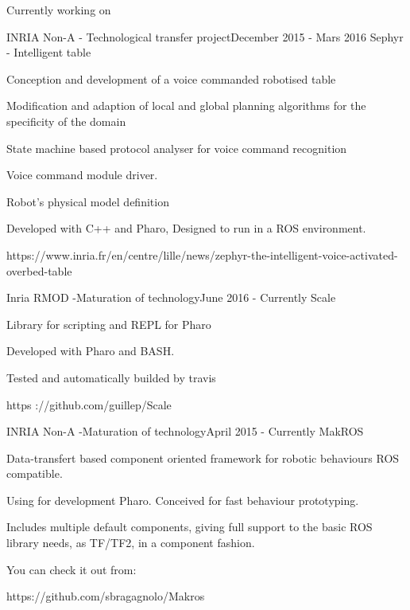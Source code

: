 \documentclass{resume} %
\begin{document}
\begin{rSection}{Currently working on}
	\begin{rSubsection}{INRIA Non-A - Technological transfer project}{December 2015 - Mars 2016 }{Sephyr - Intelligent table }
		\item 
		\item Conception and development of a voice commanded robotised table
		\item Modification and adaption of local and global planning algorithms for the specificity of the domain 
		\item State machine based protocol analyser for voice command recognition 
		\item Voice command module driver.
		\item Robot's physical model definition 
		\item Developed with C++ and Pharo, Designed to run in a ROS environment. 
		\item https://www.inria.fr/en/centre/lille/news/zephyr-the-intelligent-voice-activated-overbed-table
	\end{rSubsection}
	
	
	\begin{rSubsection}{Inria RMOD -Maturation of technology}{June 2016 - Currently }{Scale}
		\item 
		\item Library for scripting and REPL for Pharo
		\item Developed with Pharo and BASH. 
		\item Tested and automatically builded by travis
		\item https ://github.com/guillep/Scale		
	\end{rSubsection}
	
	\begin{rSubsection}{INRIA Non-A -Maturation of technology}{April 2015 - Currently }{MakROS}
		\item Data-transfert based component oriented framework for robotic behaviours ROS compatible. 
		\item Using for development Pharo. Conceived for fast behaviour prototyping.
		\item Includes multiple default components, giving full support to the basic ROS library needs, as TF/TF2, in a component fashion.
		\item You can check it out from: 
		\item https://github.com/sbragagnolo/Makros
	\end{rSubsection}
	

\end{rSection}
\end{document}
